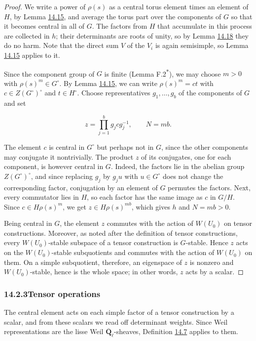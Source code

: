 \documentclass[11pt]{article}
\newcommand{\bpout}[1]{#1\textsuperscript{\hyperlink{bp-outside}{\ensuremath{\ast}}}}
\begin{document}
\begin{proof}[{Proof}]\label{bp55}%
We write a power of \(\rho(s)\) as a central torus element times an element of \(H\), by Lemma \hyperref[bp49]{14.15}, and average the torus part over the components of \(G\) so that it becomes central in all of \(G\). The factors from \(H\) that accumulate in this process are collected in \(h\); their determinants are roots of unity, so by Lemma \hyperref[bp58]{14.18} they do no harm. Note that the direct sum \(V\) of the \(V_i\) is again semisimple, so Lemma \hyperref[bp49]{14.15} applies to it.

Since the component group of \(G\) is finite (Lemma \bpout{F.2}), we may choose \(m>0\) with \(\rho(s)^m\in G^\circ\). By Lemma \hyperref[bp49]{14.15}, we can write \(\rho(s)^m=ct\) with \(c\in Z(G^\circ)^\circ\) and \(t\in H^\circ\). Choose representatives \(g_1,\ldots,g_b\) of the components of \(G\) and set

\[
z=\prod_{j=1}^bg_jcg_j^{-1},\qquad N=mb.
\]

The element \(c\) is central in \(G^\circ\) but perhaps not in \(G\), since the other components may conjugate it nontrivially. The product \(z\) of its conjugates, one for each component, is however central in \(G\). Indeed, the factors lie in the abelian group \(Z(G^\circ)^\circ\), and since replacing \(g_j\) by \(g_ju\) with \(u\in G^\circ\) does not change the corresponding factor, conjugation by an element of \(G\) permutes the factors. Next, every commutator lies in \(H\), so each factor has the same image as \(c\) in \(G/H\). Since \(c\in H\rho(s)^m\), we get \(z\in H\rho(s)^{mb}\), which gives \(h\) and \(N=mb>0\).

Being central in \(G\), the element \(z\) commutes with the action of \(W(U_0)\) on tensor constructions. Moreover, as noted after the definition of tensor constructions, every \(W(U_0)\)-stable subspace of a tensor construction is \(G\)-stable. Hence \(z\) acts on the \(W(U_0)\)-stable subquotients and commutes with the action of \(W(U_0)\) on them. On a simple subquotient, therefore, an eigenspace of \(z\) is nonzero and \(W(U_0)\)-stable, hence is the whole space; in other words, \(z\) acts by a scalar.
\end{proof}


\subsubsection*{\texorpdfstring{14.2.3\quad Tensor operations}{14.2.3 Tensor operations}}
\label{bp56}%
\label{bp57}%
The central element acts on each simple factor of a tensor construction by a scalar, and from these scalars we read off determinant weights. Since Weil representations are the lisse Weil \(\overline{\mathbf Q}_\ell\)-sheaves, Definition \hyperref[bp26]{14.7} applies to them.
\end{document}
